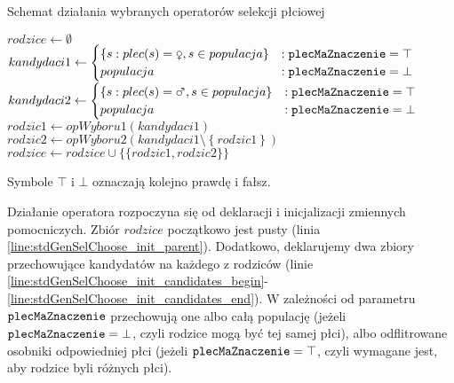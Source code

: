 \documentclass[./FM_mgr.tex]{subfiles}
\begin{document}
\begin{algorithm}
	\caption{Schemat działania wybranych operatorów selekcji płciowej \label{algorithm:common_genSel} }
	\begin{algorithmic}[1]
		\Start
		\Var $rodzice \gets \emptyset$
		\label{line:stdGenSelChoose_init_parent}
		\Var $kandydaci1 \gets \begin{cases} 
		\left\{ s: plec(s)=\female, s \in populacja \right\} &: \param{plecMaZnaczenie}=\top\\ 
		populacja &: \param{plecMaZnaczenie}=\bot
		\end{cases} $
		\label{line:stdGenSelChoose_init_candidates_begin}
		\Var $kandydaci2 \gets \begin{cases} 
		\left\{ s: plec(s)=\male, s \in populacja \right\} &: \param{plecMaZnaczenie}=\top\\ 
		populacja &: \param{plecMaZnaczenie}=\bot
		\end{cases} $
		\label{line:stdGenSelChoose_init_candidates_end}
		\label{line:stdGenSelChoose_while}
		\Var $rodzic1 \gets opWyboru1(kandydaci1) $
		\label{line:stdGenSelChoose_choose_begin}
		\Var $rodzic2 \gets opWyboru2(kandydaci1 \setminus \left\{ rodzic1 \right\}) $
		\label{line:stdGenSelChoose_choose_end}
		\State $rodzice \gets rodzice \cup \{  \{ rodzic1, rodzic2 \} \}$
		\label{line:stdGenSelChoose_parents_merge}
		\EndWhile
		\State {}
		\label{line:stdGenSelChoose_return}
		\EndOperator
	\end{algorithmic}
	Symbole $\top$ i $\bot$ oznaczają kolejno prawdę i fałsz.
\end{algorithm}

Działanie operatora rozpoczyna się od deklaracji i inicjalizacji zmiennych pomocniczych.
Zbiór $rodzice$ początkowo jest pusty (linia \ref{line:stdGenSelChoose_init_parent}).
Dodatkowo, deklarujemy dwa zbiory przechowujące kandydatów na każdego z rodziców (linie \ref{line:stdGenSelChoose_init_candidates_begin}-\ref{line:stdGenSelChoose_init_candidates_end}).
W zależności od parametru $\mathtt{plecMaZnaczenie}$ przechowują one albo całą populację (jeżeli $\mathtt{plecMaZnaczenie} = \bot$, czyli rodzice mogą być tej samej płci), albo odflitrowane osobniki odpowiedniej płci (jeżeli $\mathtt{plecMaZnaczenie} = \top$, czyli wymagane jest, aby rodzice byli różnych płci).
\end{document}
